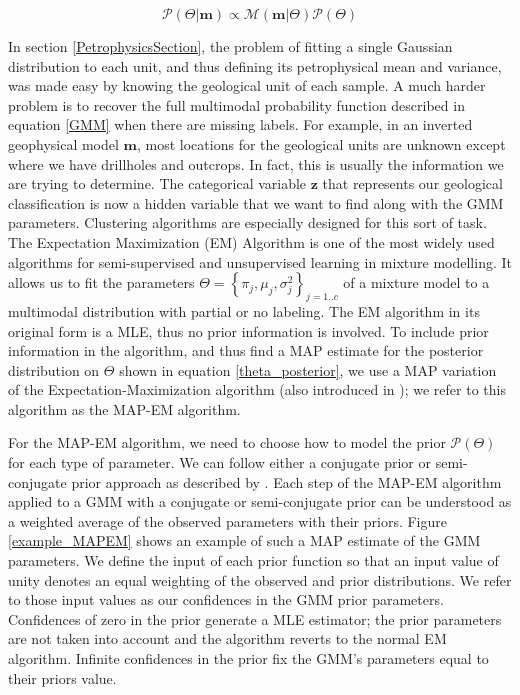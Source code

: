 \documentclass[extra]{gji} %
\begin{document}
\begin{equation}
\mathcal{P}(\Theta|\mathbf{m}) \propto \mathcal{M}(\mathbf{m}|\Theta)\mathcal{P}(\Theta)
\label{theta_posterior}
\end{equation}

In section \ref{PetrophysicsSection}, the problem of fitting a single Gaussian distribution to each unit, and thus defining its petrophysical mean and variance, was made easy by knowing the geological unit of each sample. A much harder problem is to recover the full multimodal probability function described in equation \ref{GMM} when there are missing labels. For example, in an inverted geophysical model $\mathbf{m}$, most locations for the geological units are unknown except where we have drillholes and outcrops. In fact, this is usually the information we are trying to determine. The categorical variable $\mathbf{z}$ that represents our geological classification is now a hidden variable that we want to find along with the GMM parameters. Clustering algorithms are especially designed for this sort of task. The Expectation Maximization (EM) Algorithm \citep{MR0501537} is one of the most widely used algorithms for semi-supervised and unsupervised learning in mixture modelling. It allows us to fit the parameters $\Theta=\left\{\pi_j, {\mu}_j, \sigma_j^2\right\}_{j=1..c}$ of a mixture model to a multimodal distribution with partial or no labeling. The EM algorithm in its original form is a MLE, thus no prior information is involved. To include prior information in the algorithm, and thus find a MAP estimate for the posterior distribution on $\Theta$ shown in equation \ref{theta_posterior}, we use a MAP variation of the Expectation-Maximization algorithm (also introduced in \cite{MR0501537}); we refer to this algorithm as the MAP-EM algorithm.

For the MAP-EM algorithm, we need to choose how to model the prior $\mathcal{P}(\Theta)$ for each type of parameter. We can follow either a conjugate prior or semi-conjugate prior approach as described by \cite{Murphy:2012:MLP:2380985}. Each step of the MAP-EM algorithm applied to a GMM with a conjugate or semi-conjugate prior can be understood as a weighted average of the observed parameters with their priors. Figure \ref{example_MAPEM} shows an example of such a MAP estimate of the GMM parameters. We define the input of each prior function so that an input value of unity denotes an equal weighting of the observed and prior distributions. We refer to those input values as our confidences in the GMM prior parameters. Confidences of zero in the prior generate a MLE estimator; the prior parameters are not taken into account and the algorithm reverts to the normal EM algorithm. Infinite confidences in the prior fix the GMM's parameters equal to their priors value.
\end{document}
